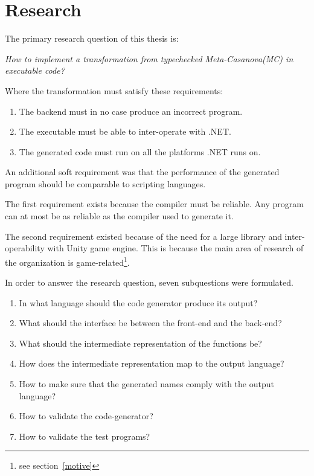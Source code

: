 \section{Research}\label{research}

The primary research question of this thesis is:

\textit{How to implement a transformation from typechecked Meta-Casanova(MC) in executable code?}

Where the transformation must satisfy these requirements:
\begin{enumerate}
    \item The backend must in no case produce an incorrect program.
    \item The executable must be able to inter-operate with .NET.
    \item The generated code must run on all the platforms .NET runs on.
\end{enumerate}

An additional soft requirement was that the performance of the generated program should be comparable to scripting languages.

The first requirement exists because the compiler must be reliable.
Any program can at most be as reliable as the compiler used to generate it.

\label{whydotnet}
The second requirement existed because of the need for a large library and inter-operability with Unity game engine.
This is because the main area of research of the organization is game-related\footnote{see section~\ref{motive}}.

In order to answer the research question, seven subquestions were formulated.

\begin{enumerate}
    \item In what language should the code generator produce its output?
    \item What should the interface be between the front-end and the back-end?
    \item What should the intermediate representation of the functions be?
    \item How does the intermediate representation map to the output language?
    \item How to make sure that the generated names comply with the output language?
    \item How to validate the code-generator?
    \item How to validate the test programs?
\end{enumerate}

